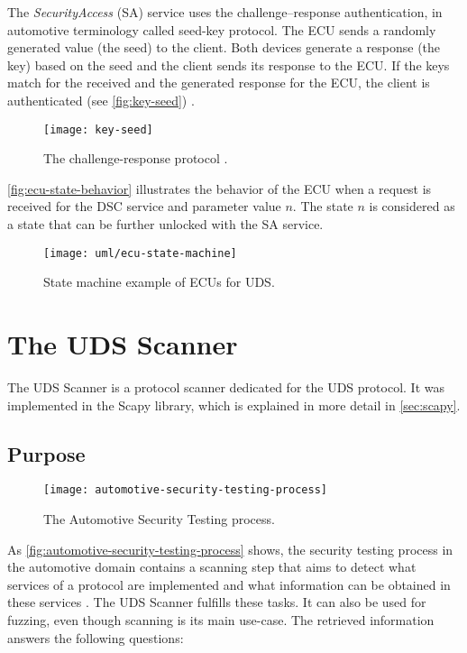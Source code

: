 The \emph{SecurityAccess} (SA) service uses the challenge–response authentication, in automotive terminology called seed-key protocol. The ECU sends a randomly generated value (the seed) to the client. Both devices generate a response (the key) based on the seed and the client sends its response to the ECU. If the keys match for the received and the generated response for the ECU, the client is authenticated (see \autoref{fig:key-seed}) \cite{iso14229}.

\begin{figure}[htb]
    \centering
    \texttt{[image: key-seed]}
    \caption{The challenge-response protocol \cite{Herrewegen2018}.}
    \label{fig:key-seed}
\end{figure}

\autoref{fig:ecu-state-behavior} illustrates the behavior of the ECU when a request is received for the DSC service and parameter value $n$. The state $n$ is considered as a state that can be further unlocked with the SA service.

\begin{figure}[htb]
    \centering
    \texttt{[image: uml/ecu-state-machine]}
    \caption{State machine example of ECUs for UDS.}
    \label{fig:ecu-state-behavior}
\end{figure}


\section{The UDS Scanner}
\label{sec:uds-scanner}

The UDS Scanner is a protocol scanner dedicated for the UDS protocol. It was implemented in the Scapy library, which is explained in more detail in \autoref{sec:scapy}.

\subsection{Purpose}

\begin{figure}[htb]
    \centering
    \texttt{[image: automotive-security-testing-process]}
    \caption{The Automotive Security Testing process.}
    \label{fig:automotive-security-testing-process}
\end{figure}

As \autoref{fig:automotive-security-testing-process} shows, the security testing process in the automotive domain contains a scanning step that aims to detect what services of a protocol are implemented and what information can be obtained in these services \cite{Bayer2015}. The UDS Scanner fulfills these tasks. It can also be used for fuzzing, even though scanning is its main use-case. The retrieved information answers the following questions:

